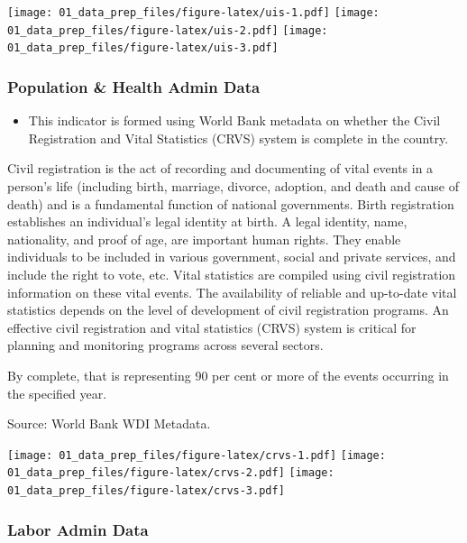 \documentclass[]{article}
\providecommand{\tightlist}{%
  \setlength{\itemsep}{0pt}\setlength{\parskip}{0pt}}
\begin{document}
\texttt{[image: 01\_data\_prep\_files/figure-latex/uis-1.pdf]}
\texttt{[image: 01\_data\_prep\_files/figure-latex/uis-2.pdf]}
\texttt{[image: 01\_data\_prep\_files/figure-latex/uis-3.pdf]}

\hypertarget{population-health-admin-data}{%
\subsubsection{Population \& Health Admin
Data}\label{population-health-admin-data}}

\begin{itemize}
\tightlist
\item
  This indicator is formed using World Bank metadata on whether the
  Civil Registration and Vital Statistics (CRVS) system is complete in
  the country.
\end{itemize}

Civil registration is the act of recording and documenting of vital
events in a person's life (including birth, marriage, divorce, adoption,
and death and cause of death) and is a fundamental function of national
governments. Birth registration establishes an individual's legal
identity at birth. A legal identity, name, nationality, and proof of
age, are important human rights. They enable individuals to be included
in various government, social and private services, and include the
right to vote, etc. Vital statistics are compiled using civil
registration information on these vital events. The availability of
reliable and up-to-date vital statistics depends on the level of
development of civil registration programs. An effective civil
registration and vital statistics (CRVS) system is critical for planning
and monitoring programs across several sectors.

By complete, that is representing 90 per cent or more of the events
occurring in the specified year.

Source: World Bank WDI Metadata.

\texttt{[image: 01\_data\_prep\_files/figure-latex/crvs-1.pdf]}
\texttt{[image: 01\_data\_prep\_files/figure-latex/crvs-2.pdf]}
\texttt{[image: 01\_data\_prep\_files/figure-latex/crvs-3.pdf]}

\hypertarget{labor-admin-data}{%
\subsubsection{Labor Admin Data}\label{labor-admin-data}}
\end{document}
